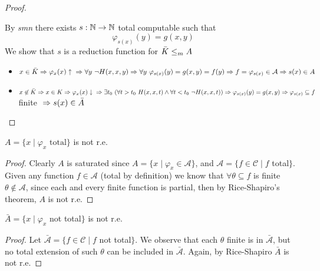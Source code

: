 \begin{proof}
\begin{enumerate}
    By \emph{smn} there exists $s:\mathbb{N}\rightarrow\mathbb{N}$ total computable such that
    \[\varphi_{s(x)}(y) = g(x,y) \]
    We show that $s$ is a reduction function for $\bar{K}\leq_m A$
    \begin{itemize}
    \item $ x\in\bar{K}\\ 
      \Rightarrow\varphi_{x}(x)\uparrow \\
      \Rightarrow\forall y\ \lnot H(x,x,y)\\ 
      \Rightarrow \forall y\ \varphi_{s(x)}(y) = g(x,y) = f(y)\\ 
      \Rightarrow f = \varphi_{s(x)} \in \mathcal{A} \\
      \Rightarrow s(x)\in A$
    \item
      $ x\not\in\bar{K}\\ 
      \Rightarrow x\in K\\ 
      \Rightarrow \varphi_x(x)\downarrow\\ 
      \Rightarrow \exists t_0 \ (\forall
      t>t_0\ H(x,x,t) \wedge \forall t<t_0 \ \lnot H(x,x,t))\\
      \Rightarrow\varphi_{s(x)}(y) = g(x,y)\\ 
      \Rightarrow \varphi_{s(x)}\subseteq f$ finite
      $\\ \Rightarrow s(x) \in \bar{A} $
    \end{itemize}
  \end{enumerate}
\end{proof}


\begin{example}\label{exe:rice1}
  $A = \{ x \mid \varphi_x \mbox{ total}\}$ is not r.e.

  \begin{proof}
    Clearly $A$ is saturated since $A = \{x \mid \varphi_x \in
    \mathcal{A}\}$, and $\mathcal{A} = \{f \in \mathcal{C} \mid f $ total$\}$. 
    Given any function $f \in \mathcal{A}$ (total by
    definition) we know that $\forall \theta \subseteq f$
    is finite $\theta \notin \mathcal{A}$, since each and every finite
    function is partial, then by Rice-Shapiro's theorem, $A$ is
    not r.e.
  \end{proof}
\end{example}

\begin{example}\label{exe:rice2}
  $\bar{A} = \{x \mid \varphi_x $ not total$\}$ is not r.e.

  \begin{proof}
    Let $\bar{\mathcal{A}} = \{f \in \mathcal{C} \mid f $ not total$\}$. We observe that each $\theta$ finite is in
    $\bar{\mathcal{A}}$, but no total extension of such $\theta$ can
    be included in $\bar{\mathcal{A}}$. Again, by Rice-Shapiro
    $\bar{A}$ is not r.e.
  \end{proof}
\end{example}

